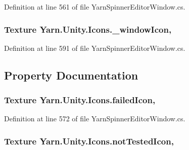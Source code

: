 Definition at line 561 of file Yarn\-Spinner\-Editor\-Window.\-cs.

\hypertarget{a00105_abba8fef6cc12836ea431a8a7c9e2f3db}{
\subsubsection[{\-\_\-window\-Icon}]{\setlength{\rightskip}{0pt plus 5cm}Texture Yarn.\-Unity.\-Icons.\-\_\-window\-Icon\hspace{0.3cm}{\ttfamily [static]}, {\ttfamily [private]}}}\label{a00105_abba8fef6cc12836ea431a8a7c9e2f3db}


Definition at line 591 of file Yarn\-Spinner\-Editor\-Window.\-cs.



\subsection{Property Documentation}
\hypertarget{a00105_aae7cc0e5016db04a90b2aa0e80957626}{
\subsubsection[{failed\-Icon}]{\setlength{\rightskip}{0pt plus 5cm}Texture Yarn.\-Unity.\-Icons.\-failed\-Icon\hspace{0.3cm}{\ttfamily [static]}, {\ttfamily [get]}}}\label{a00105_aae7cc0e5016db04a90b2aa0e80957626}


Definition at line 572 of file Yarn\-Spinner\-Editor\-Window.\-cs.

\hypertarget{a00105_ab8afce565cd2ad1543d1e32e7e589e77}{
\subsubsection[{not\-Tested\-Icon}]{\setlength{\rightskip}{0pt plus 5cm}Texture Yarn.\-Unity.\-Icons.\-not\-Tested\-Icon\hspace{0.3cm}{\ttfamily [static]}, {\ttfamily [get]}}}\label{a00105_ab8afce565cd2ad1543d1e32e7e589e77}


